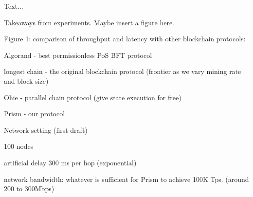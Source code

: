 


Text...

Takeaways from experiments. Maybe insert a figure here. %




Figure 1: comparison of throughput and latency with other blockchain protocols: 

Algorand - best permissionless PoS BFT protocol

longest chain - the original blockchain protocol (frontier as we vary mining rate and block size)

Ohie - parallel chain protocol (give state execution for free)

Prism - our protocol

Network setting (first draft)

100 nodes

artificial delay 300 ms per hop (exponential)

network bandwidth: whatever is sufficient for Prism to achieve 100K Tps. (around 200 to 300Mbps)


\fi
